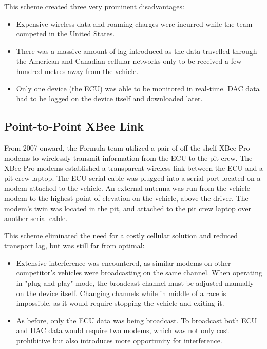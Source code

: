 This scheme created three very prominent disadvantages:

\begin{itemize}

\item Expensive wireless data and roaming charges were incurred while the team competed in the United States. 

\item There was a massive amount of lag introduced as the data travelled through the American and Canadian cellular networks only to be received a few hundred metres away from the vehicle.

\item Only one device (the ECU) was able to be monitored in real-time. DAC data had to be logged on the device itself and downloaded later.

\end{itemize}

\subsection{Point-to-Point XBee Link}

From 2007 onward, the Formula team utilized a pair of off-the-shelf XBee Pro modems to wirelessly transmit information from the ECU to the pit crew. The XBee Pro modems established a transparent wireless link between the ECU and a pit-crew laptop. The ECU serial cable was plugged into a serial port located on a modem attached to the vehicle. An external antenna was run from the vehicle modem to the highest point of elevation on the vehicle, above the driver. The modem's twin was located in the pit, and attached to the pit crew laptop over another serial cable.

This scheme eliminated the need for a costly cellular solution and reduced transport lag, but was still far from optimal:

\begin{itemize}

\item Extensive interference was encountered, as similar modems on other competitor's vehicles were broadcasting on the same channel. When operating in "plug-and-play" mode, the broadcast channel must be adjusted manually on the device itself. Changing channels while in middle of a race is impossible, as it would require stopping the vehicle and exiting it.

\item As before, only the ECU data was being broadcast. To broadcast both ECU and DAC data would require two modems, which was not only cost prohibitive but also introduces more opportunity for interference. 

\end{itemize}

